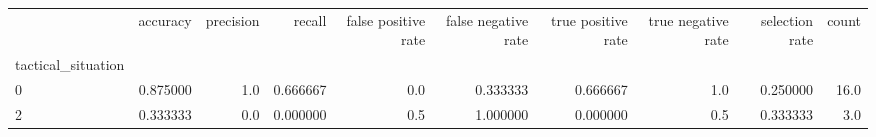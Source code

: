 \begin{tabular}{lrrrrrrrrr}
\toprule
{} &  accuracy &  precision &    recall &  false positive rate &  false negative rate &  true positive rate &  true negative rate &  selection rate &  count \\
tactical\_situation &           &            &           &                      &                      &                     &                     &                 &        \\
\midrule
0                  &  0.875000 &        1.0 &  0.666667 &                  0.0 &             0.333333 &            0.666667 &                 1.0 &        0.250000 &   16.0 \\
2                  &  0.333333 &        0.0 &  0.000000 &                  0.5 &             1.000000 &            0.000000 &                 0.5 &        0.333333 &    3.0 \\
\bottomrule
\end{tabular}
